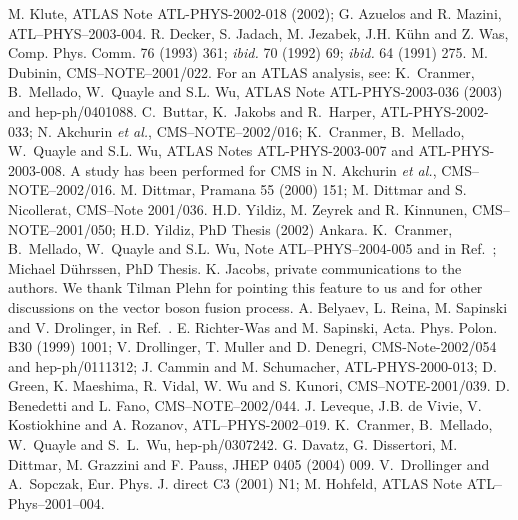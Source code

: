 \begin{thebibliography}{999}
 M. Klute, ATLAS Note ATL-PHYS-2002-018 (2002); 
G. Azuelos and R. Mazini, ATL--PHYS--2003-004. 
%
 R. Decker, S. Jadach, M. Jezabek, J.H. K\"uhn and Z.
Was, Comp. Phys. Comm. 76 (1993) 361; {\it ibid.} 70 (1992) 69; {\it ibid.} 64 (1991) 275. 
%
 M. Dubinin, CMS--NOTE--2001/022. For an ATLAS
analysis, see: K.~Cranmer, B.~Mellado, W.~Quayle and S.L. Wu,
ATLAS Note ATL-PHYS-2003-036 (2003) and hep-ph/0401088. 
%
 C.~Buttar, K.~Jakobs and R.~Harper, ATL-PHYS-2002-033;  
N. Akchurin {\it et al.}, CMS--NOTE--2002/016; K.~Cranmer, B.~Mellado, 
W.~Quayle and S.L. Wu, ATLAS Notes ATL-PHYS-2003-007 and ATL-PHYS-2003-008.
A study has been performed for CMS in N. Akchurin {\it et al.}, 
CMS--NOTE--2002/016.  
%
M. Dittmar, Pramana 55 (2000) 151; M. Dittmar and S. Nicollerat, CMS--Note 
2001/036. 
%
H.D. Yildiz, M. Zeyrek and R. Kinnunen, CMS--NOTE--2001/050;   
H.D. Yildiz, PhD Thesis (2002) Ankara. 
%
K.~Cranmer, B.~Mellado, W.~Quayle and S.L. Wu, Note ATL--PHYS--2004-005 and in 
Ref.~\cite{Houches2003}; Michael D\"uhrssen, PhD Thesis.  
%
 K. Jacobs, private communications to the authors. 
We thank Tilman Plehn for pointing this feature to us and for other discussions
on the vector boson fusion process. 
%
 A. Belyaev, L. Reina, M. Sapinski and V. Drolinger, 
in Ref.~\cite{Top-width}.
%
%
E. Richter-Was and M. Sapinski, Acta. Phys. Polon. B30 (1999) 1001; 
V. Drollinger, T. Muller and D. Denegri, CMS-Note-2002/054 and hep-ph/0111312;
J. Cammin and M. Schumacher, ATL-PHYS-2000-013; D. Green, K.  Maeshima, R. 
Vidal, W. Wu and S. Kunori, CMS--NOTE-2001/039.  
%
 D. Benedetti and L. Fano, CMS--NOTE--2002/044. 
%
J. Leveque, J.B. de Vivie, V. Kostiokhine and A. Rozanov, ATL--PHYS-2002--019. 
%
 K.~Cranmer, B.~Mellado, W.~Quayle and S.~L.~Wu,
hep-ph/0307242.
%
 G. Davatz, G. Dissertori, M. Dittmar, M. Grazzini and 
F. Pauss, JHEP 0405 (2004) 009.  
 V.~Drollinger and A.~Sopczak, Eur. Phys. J. 
direct C3 (2001) N1; M. Hohfeld, ATLAS Note ATL--Phys--2001--004. 


\end{thebibliography}
